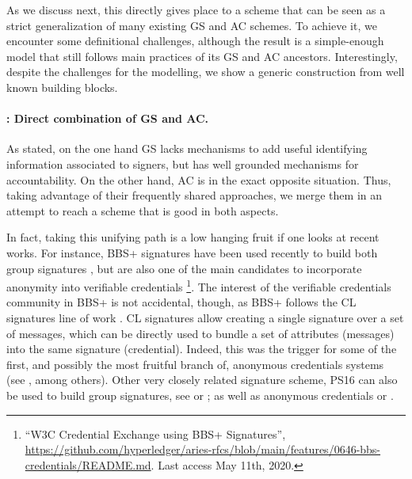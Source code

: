 As we discuss next, this directly gives place to a scheme that can be seen as a
strict generalization of many existing GS and AC schemes. To achieve it, we
encounter some definitional challenges, although the result is a simple-enough
model that still follows main practices of its GS and AC ancestors.
Interestingly, despite the challenges for the modelling, we show a generic
construction from well known building blocks.

\paragraph{\GSAC: Direct combination of GS and AC.} %
As stated, on the one hand GS lacks mechanisms to add useful identifying
information associated to signers, but has well grounded mechanisms for
accountability. On the other hand, AC is in the exact opposite situation. Thus,
taking advantage of their frequently shared approaches, we merge them in an
attempt to reach a scheme that is good in both aspects.

In fact, taking this unifying path is a low hanging fruit if one looks at recent
works. For instance, BBS+ signatures \cite{asm06,cdl16b} have been used recently
to build both group signatures \cite{gl19,dl21,fgl21}, but are also one of the
main candidates to incorporate anonymity into verifiable credentials%
\footnote{``W3C Credential Exchange using BBS+ Signatures'',
  \url{https://github.com/hyperledger/aries-rfcs/blob/main/features/0646-bbs-credentials/README.md}. Last access May 11th, 2020.}.%
The interest of the verifiable credentials community in BBS+ is not accidental,
though, as BBS+ follows the CL signatures line of work \cite{cl02}. CL signatures
allow creating a single signature over a set of messages, which can be directly
used to bundle a set of attributes (messages) into the same signature
(credential). Indeed, this was the trigger for some of the first, and possibly
the most fruitful branch of, anonymous credentials systems (see
\cite{cl01,cl02,cl04}, among others). Other very closely related signature
scheme, PS16 \cite{ps16} can
also be used to build group signatures, see \cite[Appendix A.1]{ps15} or
\cite{cdl+20}; as well as anonymous credentials \cite[Appendix A.2]{ps15} or
\cite{sms+19}.

